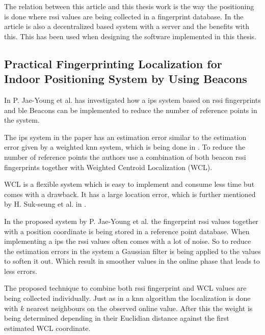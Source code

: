 \bigskip

The relation between this article and this thesis work is the way the positioning is done where \acrshort{rssi} values are being collected in a fingerprint database.
In the article is also a decentralized based system with a server and the benefits with this.
This has been used when designing the software implemented in this thesis.


\subsection{Practical Fingerprinting Localization for Indoor Positioning System by Using Beacons}\label{sec:}
In \cite{PracticalFingerprintingLocalization2017} P. Jae-Young et al. has investigated how a \acrshort{ips} system based on \acrshort{rssi} fingerprints and \acrshort{ble} Beacons can be implemented to reduce the number of reference points in the system.

\bigskip

The \acrshort{ips} system in the paper has an estimation error similar to the estimation error given by a weighted \acrshort{knn} system, which is being done in \cite{ImprovingIndoorLocalization2016}.
To reduce the number of reference points the authors use a combination of both beacon \acrshort{rssi} fingerprints together with Weighted Centroid Localization (WCL). 

\bigskip

WCL is a flexible system which is easy to implement and consume less time but comes with a drawback. 
It has a large location error, which is further mentioned by H. Suk-seung et al. in \cite{BeaconBasedIndoor2016}.

\bigskip

In the proposed system by P. Jae-Young et al. the fingerprint \acrshort{rssi} values together with a position coordinate is being stored in a reference point database.
When implementing a \acrshort{ips} the \acrshort{rssi} values often comes with a lot of noise.
So to reduce the estimation errors in the system a Gaussian filter is being applied to the values to soften it out.
Which result in smoother values in the online phase that leads to less errors.  

\bigskip

The proposed technique to combine both \acrshort{rssi} fingerprint and WCL values are being collected individually.
Just as in a \acrshort{knn} algorithm the localization is done with $k$ nearest neighbours on the observed online value.
After this the weight is being determined depending in their Euclidian distance against the first estimated WCL coordinate.

